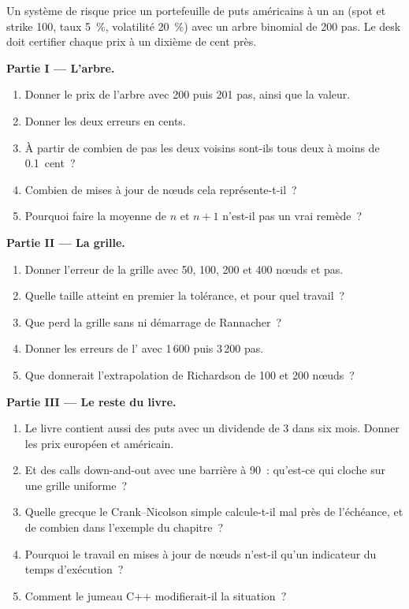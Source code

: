 \begin{problem}\label{pb:dv:trees-and-finite-difference-pricers-in-practice:1}
Un système de risque price un portefeuille de puts américains à un an (spot et strike 100, taux 5~\%, volatilité 20~\%) avec un arbre binomial de 200 pas. Le desk doit certifier chaque
prix à un dixième de cent près.

\medskip\noindent\textbf{Partie I --- L'arbre.}
\begin{enumerate}
\item Donner le prix de l'arbre avec 200 puis 201 pas, ainsi que la valeur.
\item Donner les deux erreurs en cents.
\item À partir de combien de pas les deux voisins sont-ils tous deux à moins de 0.1~cent~?
\item Combien de mises à jour de nœuds cela représente-t-il~?
\item Pourquoi faire la moyenne de $n$ et $n+1$ n'est-il pas un vrai remède~?
\end{enumerate}

\medskip\noindent\textbf{Partie II --- La grille.}
\begin{enumerate}[resume]
\item Donner l'erreur de la grille avec 50, 100, 200 et 400 nœuds et pas.
\item Quelle taille atteint en premier la tolérance, et pour quel travail~?
\item Que perd la grille sans  ni démarrage de Rannacher~?
\item Donner les erreurs de l' avec 1\,600 puis 3\,200 pas.
\item Que donnerait l'extrapolation de Richardson de 100 et 200 nœuds~?
\end{enumerate}

\medskip\noindent\textbf{Partie III --- Le reste du livre.}
\begin{enumerate}[resume]
\item Le livre contient aussi des puts avec un dividende de 3 dans six mois. Donner les prix européen et américain.
\item Et des calls down-and-out avec une barrière à 90~: qu'est-ce qui cloche sur une grille uniforme~?
\item Quelle grecque le Crank--Nicolson simple calcule-t-il mal près de l'échéance, et de combien dans l'exemple du chapitre~?
\item Pourquoi le travail en mises à jour de nœuds n'est-il qu'un indicateur du temps d'exécution~?
\item Comment le jumeau C++ modifierait-il la situation~?
\end{enumerate}


\end{problem}
